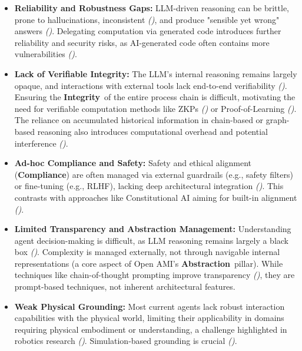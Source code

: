 \documentclass[12pt,a4paper]{report}
\renewcommand{\citep}[1]{\textit{\scriptsize{(\cite{#1})}}}
\newcommand{\Compliance}{\textbf{Compliance}}
\newcommand{\Integrity}{\textbf{Integrity}}
\newcommand{\Abstraction}{\textbf{Abstraction}}
\begin{document}
	\begin{itemize}[noitemsep]
		\item \textbf{Reliability and Robustness Gaps:} LLM-driven reasoning can be brittle, prone to hallucinations, inconsistent \citep{AgenticLandscape_Ref86}, and produce "sensible yet wrong" answers \citep{AdditionalCitationRef33}. Delegating computation via generated code introduces further reliability and security risks, as AI-generated code often contains more vulnerabilities \citep{Physics-InspiredReasoning_Ref10, AdditionalCitationRef14}.
		\newline
		\item \textbf{Lack of Verifiable Integrity:} The LLM's internal reasoning remains largely opaque, and interactions with external tools lack end-to-end verifiability \citep{AgenticLandscape_Ref25}. Ensuring the \Integrity\ of the entire process chain is difficult, motivating the need for verifiable computation methods like ZKPs \citep{Peng2025ZKMLSurvey} or Proof-of-Learning \citep{Jia2021ProofOfLearning}. The reliance on accumulated historical information in chain-based or graph-based reasoning also introduces computational overhead and potential interference \citep{Teng2025AtomOfThoughtsRef}.
		\newline
		\item \textbf{Ad-hoc Compliance and Safety:} Safety and ethical alignment (\Compliance) are often managed via external guardrails (e.g., safety filters) or fine-tuning (e.g., RLHF), lacking deep architectural integration \citep{AWS2024SafetyGuardrails, Sekrst2024Guardrails}. This contrasts with approaches like Constitutional AI aiming for built-in alignment \citep{Bai2022ConstitutionalAI}.
		\newline
		\item \textbf{Limited Transparency and Abstraction Management:} Understanding agent decision-making is difficult, as LLM reasoning remains largely a black box \citep{AdditionalCitationRef37}. Complexity is managed externally, not through navigable internal representations (a core aspect of Open AMI's \Abstraction\ pillar). While techniques like chain-of-thought prompting improve transparency \citep{AdditionalCitationRef38}, they are prompt-based techniques, not inherent architectural features.
		\newline
		\item \textbf{Weak Physical Grounding:} Most current agents lack robust interaction capabilities with the physical world, limiting their applicability in domains requiring physical embodiment or understanding, a challenge highlighted in robotics research \citep{AdditionalCitationRef39}. Simulation-based grounding is crucial \citep{Li2025DigitalTwins}.
	\end{itemize}
	
\end{document}
